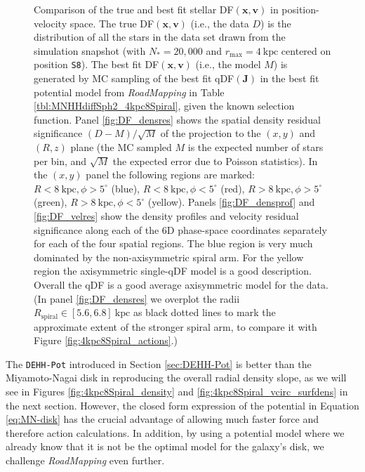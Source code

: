 \documentclass[iop,revtex4,numberedappendix,appendixfloats]{emulateapj}
\newcommand{\vect}[1]{\boldsymbol{#1}}
\newcommand{\RM}{{\sl RoadMapping}}
\newcommand{\hiddenComment}[1]{}
\begin{document}
\begin{figure}[!htbp]
  \caption{Comparison of the true and best fit stellar DF$(\vect{x},\vect{v})$ in position-velocity space. The true DF$(\vect{x},\vect{v})$ (i.e., the data $D$) is the distribution of all the stars in the data set drawn from the simulation snapshot (with $N_*=20,000$ and $r_\text{max}=4~\text{kpc}$ centered on position \texttt{S8}). The best fit DF$(\vect{x},\vect{v})$ (i.e., the model $M$) is generated by MC sampling of the best fit qDF$(\vect{J})$ in the best fit potential model from \RM{} in Table \ref{tbl:MNHHdiffSph2_4kpc8Spiral}, given the known selection function. Panel \ref{fig:DF_densres} shows the spatial density residual significance $(D-M)/\sqrt{M}$ of the projection to the $(x,y)$ and $(R,z)$ plane (the MC sampled $M$ is the expected number of stars per bin, and $\sqrt{M}$ the expected error due to Poisson statistics). In the $(x,y)$ panel the following regions are marked: $R<8~\text{kpc},\phi>5^\circ$ (blue), $R<8~\text{kpc},\phi<5^\circ$ (red), $R>8~\text{kpc},\phi>5^\circ$ (green), $R>8~\text{kpc},\phi<5^\circ$ (yellow). Panels \ref{fig:DF_densprof} and \ref{fig:DF_velres} show the density profiles and velocity residual significance along each of the 6D phase-space coordinates separately for each of the four spatial regions. The blue region is very much dominated by the non-axisymmetric spiral arm. For the yellow region the axisymmetric single-qDF model is a good description. Overall the qDF is a good average axisymmetric model for the data. (In panel \ref{fig:DF_densres} we overplot the radii $R_\text{spiral} \in [5.6,6.8]~\text{kpc}$ as black dotted lines to mark the approximate extent of the stronger spiral arm, to compare it with Figure \ref{fig:4kpc8Spiral_actions}.)}
  \label{fig:4kpc8Spiral_DF_comparison}
\end{figure}

\hiddenComment{[TO DO: Elena writes: "Do you mean that the DEHH-Pot is the best fit if you account for spiral structure in the snapshot?"]} The \texttt{DEHH-Pot} introduced in Section \ref{sec:DEHH-Pot} is better than the Miyamoto-Nagai disk in reproducing the overall radial density slope, as we will see in Figures \ref{fig:4kpc8Spiral_density} and \ref{fig:4kpc8Spiral_vcirc_surfdens} in the next section. However, the closed form expression of the potential in Equation \eqref{eq:MN-disk} has the crucial advantage of allowing much faster force and therefore action calculations. In addition, by using a potential model where we already know that it is not be the optimal model for the galaxy's disk, we challenge \RM{} even further.
\end{document}
